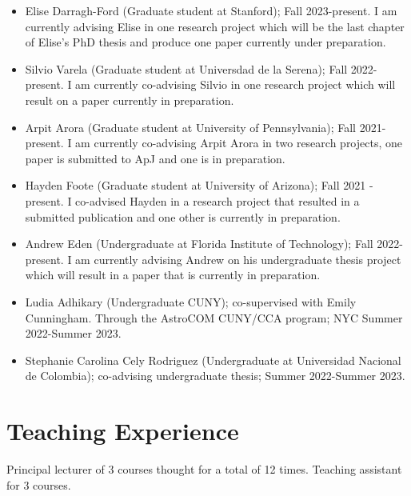 \documentclass[UTF8]{article}
\begin{document}
\begin{itemize}
  \setlength\itemsep{0.0em}
  \renewcommand\labelitemi{$\cdot$}
  \item Elise Darragh-Ford (Graduate student at Stanford); Fall 2023-present. I
    am currently advising Elise in one research project which will be the last
    chapter of Elise's PhD thesis and produce one paper currently under
    preparation. 
  \item Silvio Varela (Graduate student at Universdad de la Serena); Fall 2022-present. I am
    currently co-advising Silvio in one research project which will result on a paper currently in preparation.  
  \item Arpit Arora (Graduate student at University of Pennsylvania); Fall 2021-present. I am
    currently co-advising Arpit Arora in two research projects, one paper is
    submitted to ApJ and one is in preparation.
  \item Hayden Foote (Graduate student at University of Arizona); Fall 2021 -
    present. I co-advised Hayden in a research project that resulted in a
    submitted publication and one other is currently in preparation. 
  \item Andrew Eden (Undergraduate at Florida Institute of Technology); Fall 2022-present.
    I am currently advising Andrew on his undergraduate thesis project which
    will result in a paper that is currently in preparation.  
  \item Ludia Adhikary (Undergraduate CUNY); co-supervised with Emily Cunningham.
    Through the AstroCOM CUNY/CCA program; NYC Summer 2022-Summer 2023.
\item Stephanie Carolina Cely Rodriguez (Undergraduate at Universidad Nacional de Colombia);
  co-advising undergraduate thesis; Summer 2022-Summer 2023.
\end{itemize}

\section*{Teaching Experience}

Principal lecturer of 3 courses thought for a total of 12 times. Teaching assistant for 3 courses.
\end{document}
